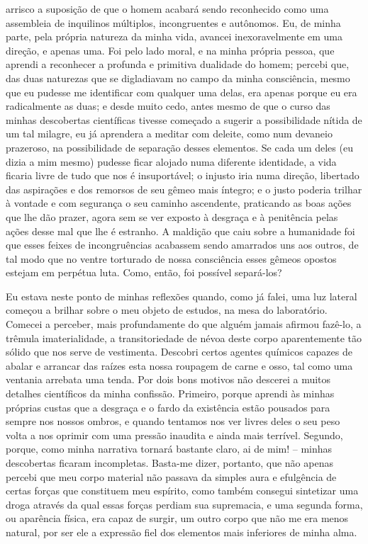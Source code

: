 arrisco a suposição de que o homem acabará sendo reconhecido como uma
assembleia de inquilinos múltiplos, incongruentes e autônomos. Eu, de
minha parte, pela própria natureza da minha vida, avancei
inexoravelmente em uma direção, e apenas uma.  Foi pelo lado moral, e
na minha própria pessoa, que aprendi a reconhecer a profunda e
primitiva dualidade do homem; percebi que, das duas naturezas que se
digladiavam no campo da minha consciência, mesmo que eu pudesse me
identificar com qualquer uma delas, era apenas porque eu era
radicalmente as duas; e desde muito cedo, antes mesmo de que o curso
das minhas descobertas científicas tivesse começado a sugerir a
possibilidade nítida de um tal milagre, eu já aprendera a meditar com
deleite, como num devaneio prazeroso, na possibilidade de separação
desses elementos.  Se cada um deles (eu dizia a mim mesmo) pudesse
ficar alojado numa diferente identidade, a vida ficaria livre de tudo
que nos é insuportável; o injusto iria numa direção, libertado das
aspirações e dos remorsos de seu gêmeo mais íntegro; e o justo poderia
trilhar à vontade e com segurança o seu caminho ascendente, praticando
as boas ações que lhe dão prazer, agora sem se ver exposto à desgraça e
à penitência pelas ações desse mal que lhe é estranho.  A maldição que
caiu sobre a humanidade foi que esses feixes de incongruências
acabassem sendo amarrados uns aos outros, de tal modo que no ventre
torturado de nossa consciência esses gêmeos opostos estejam em perpétua
luta.  Como, então, foi possível separá-los?

Eu estava neste ponto de minhas reflexões quando, como já falei, uma luz
lateral começou a brilhar sobre o meu objeto de estudos, na mesa do
laboratório.  Comecei a perceber, mais profundamente do que alguém
jamais afirmou fazê-lo, a trêmula imaterialidade, a transitoriedade de
névoa deste corpo aparentemente tão sólido que nos serve de vestimenta.
 Descobri certos agentes químicos capazes de abalar e arrancar das
raízes esta nossa roupagem de carne e osso, tal como uma ventania
arrebata uma tenda.  Por dois bons motivos não descerei a muitos
detalhes científicos da minha confissão.  Primeiro, porque aprendi às
minhas próprias custas que a desgraça e o fardo da existência estão
pousados para sempre nos nossos ombros, e quando tentamos nos ver
livres deles o seu peso volta a nos oprimir com uma pressão inaudita e
ainda mais terrível.  Segundo, porque, como minha narrativa tornará
bastante claro, ai de mim! -- minhas descobertas ficaram incompletas. 
Basta-me dizer, portanto, que não apenas percebi que meu corpo material
não passava da simples aura e efulgência de certas forças que
constituem meu espírito, como também consegui sintetizar uma droga
através da qual essas forças perdiam sua supremacia, e uma segunda
forma, ou aparência física, era capaz de surgir, um outro corpo que não
me era menos natural, por ser ele a expressão fiel dos elementos mais
inferiores de minha alma.

